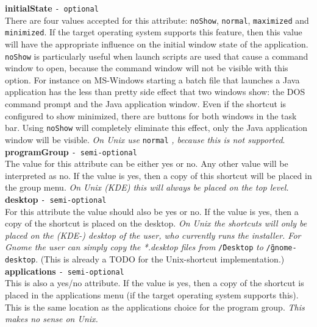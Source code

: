 \textbf{initialState} \texttt{- optional}\\

There are four values accepted for this attribute: \texttt{noShow},
\texttt{normal}, \texttt{maximized} and \texttt{minimized}. If the
target operating system supports this feature, then this value will have
the appropriate influence on the initial window state of the
application. \texttt{noShow} is particularly useful when launch scripts
are used that cause a command window to open, because the command window
will not be visible with this option. For instance on MS-Windows
starting a batch file that launches a Java application has the less than
pretty side effect that two windows show: the DOS command prompt and the
Java application window. Even if the shortcut is configured to show
minimized, there are buttons for both windows in the task bar. Using
\texttt{noShow} will completely eliminate this effect, only the Java
application window will be visible.  \textit{On Unix use } \texttt{normal}
\textit{, because this is not supported}.\\

\textbf{programGroup} \texttt{- semi-optional}\\

The value for this attribute can be either yes or no. Any other value
will be interpreted as no. If the value is yes, then a copy of this
shortcut will be placed in the group menu.
\textit{On Unix (KDE) this will always be placed on the top level.}\\

\textbf{desktop} \texttt{- semi-optional}\\

For this attribute the value should also be yes or no. If the value is
yes, then a copy of the shortcut is placed on the desktop.
\textit{On Unix the shortcuts will only be placed on the (KDE-) desktop
of the user, who currently runs the installer. For Gnome the user can
simply copy the *.desktop files from } \texttt{\~/Desktop} \textit{ to }
\texttt{\~/gnome-desktop}.
(This is already a TODO for the Unix-shortcut implementation.)\\

\textbf{applications} \texttt{- semi-optional}\\

This is also a yes/no attribute. If the value is yes, then a copy of the
shortcut is placed in the applications menu (if the target operating
system supports this). This is the same location as the applications
choice for the program group.
\textit{This makes no sense on Unix.}\\

